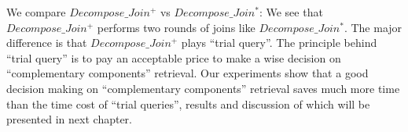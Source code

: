 We compare  $Decompose\_Join^{+}$ vs $Decompose\_Join^{*}$: We see that $Decompose\_Join^{+}$ performs two rounds of joins like $Decompose\_Join^{*}$. The major difference is that $Decompose\_Join^{+}$ plays ``trial query''. The principle behind ``trial query'' is to pay an acceptable price to make a wise decision on ``complementary components'' retrieval. Our experiments show that a good decision making on ``complementary components'' retrieval saves much more time than the time cost of ``trial queries'', results and discussion of which will be presented in next chapter.




